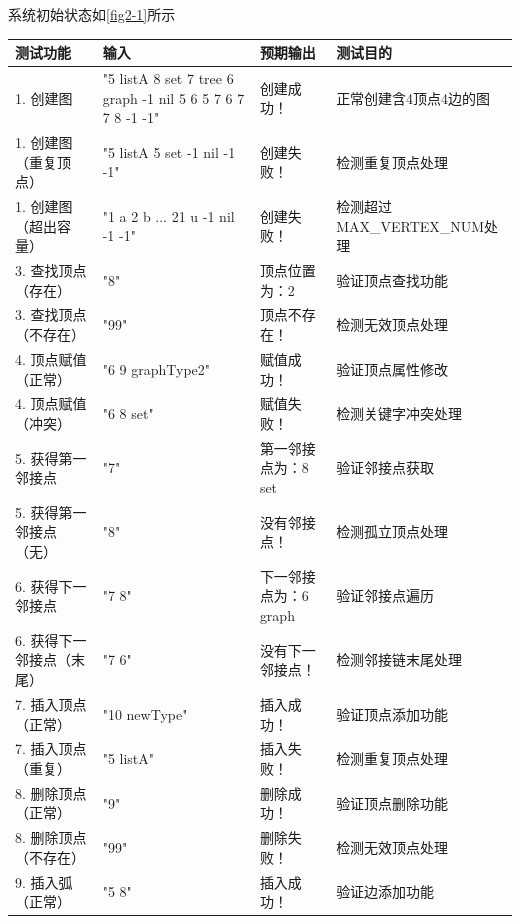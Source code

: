 \documentclass[supercite]{Experimental_Report}
\theoremstyle{definition}
\begin{document}
系统初始状态如\ref{fig2-1}所示

\begin{center}
    \setlength{\tabcolsep}{2.0mm}
    \label{table:graph-test-cases}
    \begin{tabularx}{\textwidth}{|l|X|X|X|}
        \hline
        \textbf{测试功能} & \textbf{输入} & \textbf{预期输出} & \textbf{测试目的} \\
        \hline
        1. 创建图 & "5 listA 8 set 7 tree 6 graph -1 nil 5 6 5 7 6 7 7 8 -1 -1" & 创建成功！ & 正常创建含4顶点4边的图 \\
        \hline
        1. 创建图（重复顶点） & "5 listA 5 set -1 nil -1 -1" & 创建失败！ & 检测重复顶点处理 \\
        \hline
        1. 创建图（超出容量） & "1 a 2 b ... 21 u -1 nil -1 -1" & 创建失败！ & 检测超过MAX\_VERTEX\_NUM处理 \\
        \hline
        3. 查找顶点（存在） & "8" & 顶点位置为：2 & 验证顶点查找功能 \\
        \hline
        3. 查找顶点（不存在） & "99" & 顶点不存在！ & 检测无效顶点处理 \\
        \hline
        4. 顶点赋值（正常） & "6 9 graphType2" & 赋值成功！ & 验证顶点属性修改 \\
        \hline
        4. 顶点赋值（冲突） & "6 8 set" & 赋值失败！ & 检测关键字冲突处理 \\
        \hline
        5. 获得第一邻接点 & "7" & 第一邻接点为：8 set & 验证邻接点获取 \\
        \hline
        5. 获得第一邻接点（无） & "8" & 没有邻接点！ & 检测孤立顶点处理 \\
        \hline
        6. 获得下一邻接点 & "7 8" & 下一邻接点为：6 graph & 验证邻接点遍历 \\
        \hline
        6. 获得下一邻接点（末尾） & "7 6" & 没有下一邻接点！ & 检测邻接链末尾处理 \\
        \hline
        7. 插入顶点（正常） & "10 newType" & 插入成功！ & 验证顶点添加功能 \\
        \hline
        7. 插入顶点（重复） & "5 listA" & 插入失败！ & 检测重复顶点处理 \\
        \hline
        8. 删除顶点（正常） & "9" & 删除成功！ & 验证顶点删除功能 \\
        \hline
        8. 删除顶点（不存在） & "99" & 删除失败！ & 检测无效顶点处理 \\
        \hline
        9. 插入弧（正常） & "5 8" & 插入成功！ & 验证边添加功能 \\

\end{tabularx}
\end{center}
\end{document}
